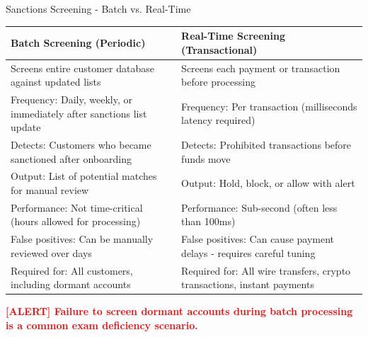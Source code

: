 \documentclass[11pt,a4paper]{beamer}
\newcommand{\redflag}[1]{\textcolor{red}{\textbf{[ALERT] #1}}}
\begin{document}
	\begin{frame}{Sanctions Screening - Batch vs. Real-Time}
		\begin{longtable}{p{}|p{}}
			\hline
			\rowcolor{lightgray}
			\textbf{Batch Screening (Periodic)} & \textbf{Real-Time Screening (Transactional)} \\
			\hline
			Screens entire customer database against updated lists & Screens each payment or transaction before processing \\
			\hline
			Frequency: Daily, weekly, or immediately after sanctions list update & Frequency: Per transaction (milliseconds latency required) \\
			\hline
			Detects: Customers who became sanctioned after onboarding & Detects: Prohibited transactions before funds move \\
			\hline
			Output: List of potential matches for manual review & Output: Hold, block, or allow with alert \\
			\hline
			Performance: Not time-critical (hours allowed for processing) & Performance: Sub-second (often less than 100ms) \\
			\hline
			False positives: Can be manually reviewed over days & False positives: Can cause payment delays - requires careful tuning \\
			\hline
			Required for: All customers, including dormant accounts & Required for: All wire transfers, crypto transactions, instant payments \\
			\hline
		\end{longtable}
		
		\redflag{Failure to screen dormant accounts during batch processing is a common exam deficiency scenario.}
	\end{frame}
	
\end{document}
